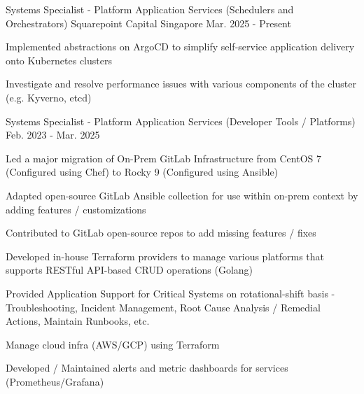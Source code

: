

\begin{cventries}

  \cventry
    {Systems Specialist - Platform Application Services (Schedulers and Orchestrators)} %
    {Squarepoint Capital} %
    {Singapore} %
    {Mar. 2025 - Present} %
    {
      \begin{cvitems} %
        \item {Implemented abstractions on ArgoCD to simplify self-service application delivery onto Kubernetes clusters}
        \item {Investigate and resolve performance issues with various components of the cluster (e.g. Kyverno, etcd)}
      \end{cvitems}
    }

  \cventry
    {Systems Specialist - Platform Application Services (Developer Tools / Platforms)} %
    {}
    {}
    {Feb. 2023 - Mar. 2025} %
    {
      \begin{cvitems} %
        \item {Led a major migration of On-Prem GitLab Infrastructure from CentOS 7 (Configured using Chef) to Rocky 9 (Configured using Ansible)}
        \item {Adapted open-source GitLab Ansible collection for use within on-prem context by adding features / customizations}
        \item {Contributed to GitLab open-source repos to add missing features / fixes}
        \item {Developed in-house Terraform providers to manage various platforms that supports RESTful API-based CRUD operations (Golang)}
        \item {Provided Application Support for Critical Systems on rotational-shift basis - Troubleshooting, Incident Management, Root Cause Analysis / Remedial Actions, Maintain Runbooks, etc.}
        \item {Manage cloud infra (AWS/GCP) using Terraform}
        \item {Developed / Maintained alerts and metric dashboards for services (Prometheus/Grafana)}
      \end{cvitems}
    }


\end{cventries}
